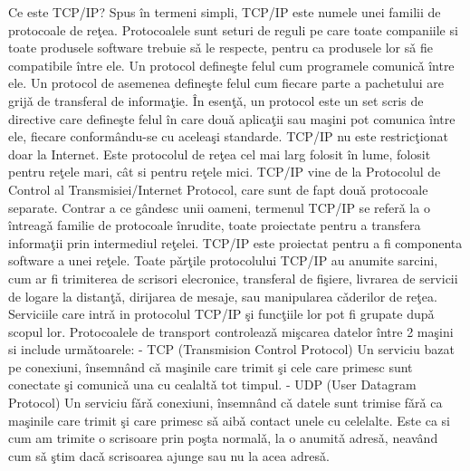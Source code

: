 \documentclass[runningheads]{llncs}
\begin{document}
Ce este TCP/IP?
 Spus în termeni simpli, TCP/IP este numele unei familii de protocoale de reţea.
Protocoalele sunt seturi de reguli pe care toate companiile si toate produsele software
trebuie sǎ le respecte, pentru ca produsele lor sǎ fie compatibile între ele. Un protocol
defineşte felul cum programele comunicǎ între ele. Un protocol de asemenea defineşte
felul cum fiecare parte a pachetului are grijǎ de transferal de informaţie.
 În esenţǎ, un protocol este un set scris de directive care defineşte felul în care
douǎ aplicaţii sau maşini pot comunica între ele, fiecare conformându-se cu aceleaşi
standarde. TCP/IP nu este restricţionat doar la Internet. Este protocolul de reţea cel mai
larg folosit în lume, folosit pentru reţele mari, cât si pentru reţele mici.
 TCP/IP vine de la Protocolul de Control al Transmisiei/Internet Protocol, care
sunt de fapt douǎ protocoale separate. Contrar a ce gândesc unii oameni, termenul
TCP/IP se referǎ la o întreagǎ familie de protocoale înrudite, toate proiectate pentru a
transfera informaţii prin intermediul reţelei. TCP/IP este proiectat pentru a fi componenta
software a unei reţele. Toate pǎrţile protocolului TCP/IP au anumite sarcini, cum ar fi
trimiterea de scrisori elecronice, transferal de fişiere, livrarea de servicii de logare la
distanţǎ, dirijarea de mesaje, sau manipularea cǎderilor de reţea.
 Serviciile care intrǎ in protocolul TCP/IP şi funcţiile lor pot fi grupate dupǎ
scopul lor. Protocoalele de transport controleazǎ mişcarea datelor între 2 maşini si
include urmǎtoarele:
- TCP (Transmision Control Protocol) Un serviciu bazat pe conexiuni,
însemnând cǎ maşinile care trimit şi cele care primesc sunt conectate şi
comunicǎ una cu cealaltǎ tot timpul.
- UDP (User Datagram Protocol) Un serviciu fǎrǎ conexiuni, însemnând cǎ
datele sunt trimise fǎrǎ ca maşinile care trimit şi care primesc sǎ aibǎ contact
unele cu celelalte. Este ca si cum am trimite o scrisoare prin poşta normalǎ, la
o anumitǎ adresǎ, neavând cum sǎ ştim dacǎ scrisoarea ajunge sau nu la acea
adresǎ.
\end{document}
